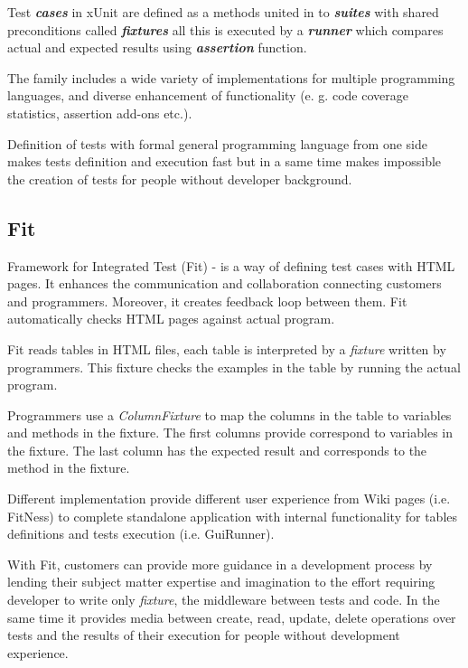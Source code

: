 Test \textbf{\textit{cases}} in xUnit are defined as a methods united in to \textbf{\textit{suites}} with shared preconditions called \textbf{\textit{fixtures}} all this is executed by a \textbf{\textit{runner}} which compares actual and expected results using \textbf{ \textit{assertion}} function.

The family includes a wide variety of implementations for multiple programming languages, and diverse enhancement of functionality (e. g. code coverage statistics, assertion add-ons etc.)\cite{xunitWiki}.

Definition of tests with formal general programming language from one side makes tests definition and execution fast but in a same time makes impossible the creation of tests for people without developer background. 

\subsection{Fit}
Framework for Integrated Test (Fit) - is a way of defining test cases with HTML pages. It enhances the communication and collaboration connecting customers and programmers. Moreover, it creates feedback loop between them. Fit automatically checks HTML pages against actual program\cite{fit}.

Fit reads tables in HTML files, each table is interpreted by a \textit{fixture} written by programmers. This fixture checks the examples in the table by running the actual program\cite{fitIntro}.

Programmers use a \textit{ColumnFixture} to map the columns in the table to variables and methods in the fixture. The first columns provide correspond to variables in the fixture. The last column has the expected result and corresponds to the method in the fixture\cite{fitIntro}.

Different implementation provide different user experience from Wiki pages (i.e. FitNess) to complete standalone application with internal functionality for tables definitions and tests execution (i.e. GuiRunner).

With Fit, customers can provide more guidance in a development process by lending their subject matter expertise and imagination to the effort\cite{fit} requiring developer to write only \textit{fixture}, the middleware between tests and code. In the same time it provides media between create, read, update, delete operations over tests and the results of their execution for people without development experience.

